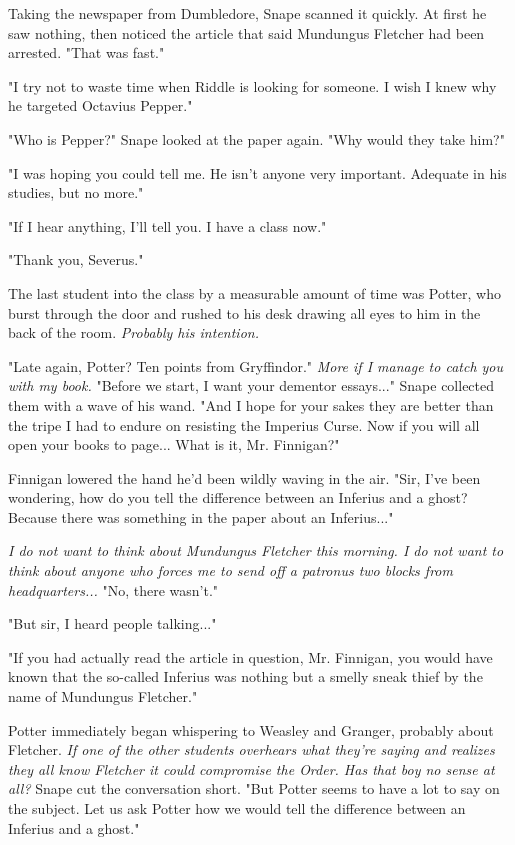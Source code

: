 Taking the newspaper from Dumbledore, Snape scanned it quickly. At first he saw nothing, then noticed the article that said Mundungus Fletcher had been arrested. "That was fast."

"I try not to waste time when Riddle is looking for someone. I wish I knew why he targeted Octavius Pepper."

"Who is Pepper?" Snape looked at the paper again. "Why would they take him?"

"I was hoping you could tell me. He isn't anyone very important. Adequate in his studies, but no more."

"If I hear anything, I'll tell you. I have a class now."

"Thank you, Severus."

The last student into the class by a measurable amount of time was Potter, who burst through the door and rushed to his desk drawing all eyes to him in the back of the room. \emph{Probably his intention.}

"Late again, Potter? Ten points from Gryffindor." \emph{More if I manage to catch you with my book.} "Before we start, I want your dementor essays..." Snape collected them with a wave of his wand. "And I hope for your sakes they are better than the tripe I had to endure on resisting the Imperius Curse. Now if you will all open your books to page... What is it, Mr. Finnigan?"

Finnigan lowered the hand he'd been wildly waving in the air. "Sir, I've been wondering, how do you tell the difference between an Inferius and a ghost? Because there was something in the paper about an Inferius..."

\emph{I do not want to think about Mundungus Fletcher this morning. I do not want to think about anyone who forces me to send off a patronus two blocks from headquarters...} "No, there wasn't."

"But sir, I heard people talking..."

"If you had actually read the article in question, Mr. Finnigan, you would have known that the so-called Inferius was nothing but a smelly sneak thief by the name of Mundungus Fletcher."

Potter immediately began whispering to Weasley and Granger, probably about Fletcher. \emph{If one of the other students overhears what they're saying and realizes they all know Fletcher it could compromise the Order. Has that boy no sense at all?} Snape cut the conversation short. "But Potter seems to have a lot to say on the subject. Let us ask Potter how we would tell the difference between an Inferius and a ghost."


